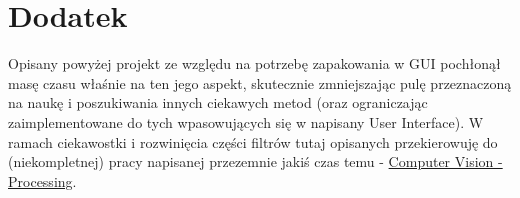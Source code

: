 \documentclass[a4paper]{article}
\begin{document}
\section{Dodatek}

Opisany powyżej projekt ze względu na potrzebę zapakowania w GUI pochłonął masę czasu właśnie na ten jego aspekt, skutecznie zmniejszając pulę przeznaczoną na naukę i poszukiwania innych ciekawych metod (oraz ograniczając zaimplementowane do tych wpasowujących się w napisany User Interface). W ramach ciekawostki i rozwinięcia części filtrów tutaj opisanych przekierowuję do (niekompletnej) pracy napisanej przezemnie jakiś czas temu - \href{https://github.com/Pawlo77/Computer-Vision/tree/main/processing}{Computer Vision - Processing}.
\end{document}
